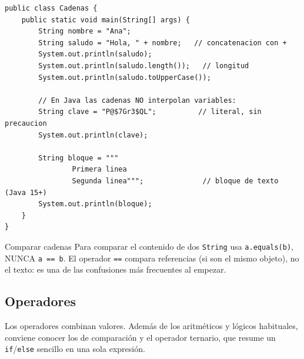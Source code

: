 \documentclass[11pt]{article}
\begin{document}
\begin{cajacodigo}
\begin{lstlisting}[style=java]
public class Cadenas {
    public static void main(String[] args) {
        String nombre = "Ana";
        String saludo = "Hola, " + nombre;   // concatenacion con +
        System.out.println(saludo);
        System.out.println(saludo.length());   // longitud
        System.out.println(saludo.toUpperCase());

        // En Java las cadenas NO interpolan variables:
        String clave = "P@$7Gr3$QL";          // literal, sin precaucion
        System.out.println(clave);

        String bloque = """
                Primera linea
                Segunda linea""";              // bloque de texto (Java 15+)
        System.out.println(bloque);
    }
}
\end{lstlisting}
\end{cajacodigo}
\vspace{2pt}
\begin{cajawarn}{Comparar cadenas}
Para comparar el contenido de dos \texttt{String} usa \texttt{a.\allowbreak{}equals(b)}, NUNCA \texttt{a =\allowbreak{}=\allowbreak{} b}. El operador \texttt{=\allowbreak{}=\allowbreak{}} compara referencias (si son el mismo objeto), no el texto: es una de las confusiones más frecuentes al empezar.\par
\end{cajawarn}
\subsection{Operadores}
Los operadores combinan valores. Además de los aritméticos y lógicos habituales, conviene conocer los de comparación y el operador ternario, que resume un \texttt{if}/\texttt{else} sencillo en una sola expresión.
\end{document}
